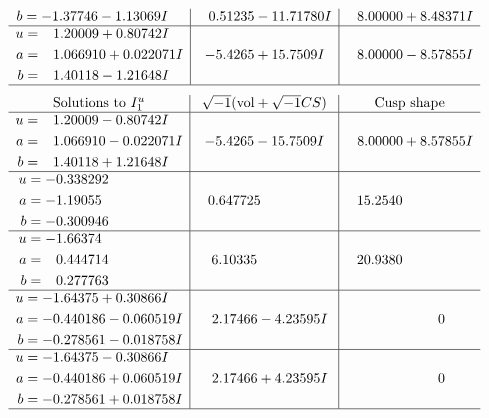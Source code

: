 \documentclass[1p]{elsarticle_modified}
\theoremstyle{definition}
\newcommand{\I}{\sqrt{-1}}
\begin{document}
$$\begin{array}{c|c|c}
\begin{aligned}
b &= -1.37746 - 1.13069 I\end{aligned}
 & \phantom{-}0.51235 - 11.71780 I & \phantom{-}8.00000 + 8.48371 I \\ \hline\begin{aligned}
u &= \phantom{-}1.20009 + 0.80742 I \\
a &= \phantom{-}1.066910 + 0.022071 I \\
b &= \phantom{-}1.40118 - 1.21648 I\end{aligned}
 & -5.4265 + 15.7509 I & \phantom{-}8.00000 - 8.57855 I\\
 \hline 
 \end{array}$$\newpage$$\begin{array}{c|c|c}  
\text{Solutions to }I^u_{1}& \I (\text{vol} + \sqrt{-1}CS) & \text{Cusp shape}\\
 \hline 
\begin{aligned}
u &= \phantom{-}1.20009 - 0.80742 I \\
a &= \phantom{-}1.066910 - 0.022071 I \\
b &= \phantom{-}1.40118 + 1.21648 I\end{aligned}
 & -5.4265 - 15.7509 I & \phantom{-}8.00000 + 8.57855 I \\ \hline\begin{aligned}
u &= -0.338292\phantom{ +0.000000I} \\
a &= -1.19055\phantom{ +0.000000I} \\
b &= -0.300946\phantom{ +0.000000I}\end{aligned}
 & \phantom{-}0.647725\phantom{ +0.000000I} & \phantom{-}15.2540\phantom{ +0.000000I} \\ \hline\begin{aligned}
u &= -1.66374\phantom{ +0.000000I} \\
a &= \phantom{-}0.444714\phantom{ +0.000000I} \\
b &= \phantom{-}0.277763\phantom{ +0.000000I}\end{aligned}
 & \phantom{-}6.10335\phantom{ +0.000000I} & \phantom{-}20.9380\phantom{ +0.000000I} \\ \hline\begin{aligned}
u &= -1.64375 + 0.30866 I \\
a &= -0.440186 - 0.060519 I \\
b &= -0.278561 - 0.018758 I\end{aligned}
 & \phantom{-}2.17466 - 4.23595 I & \phantom{-0.000000 } 0 \\ \hline\begin{aligned}
u &= -1.64375 - 0.30866 I \\
a &= -0.440186 + 0.060519 I \\
b &= -0.278561 + 0.018758 I\end{aligned}
 & \phantom{-}2.17466 + 4.23595 I & \phantom{-0.000000 } 0\\
 \hline 
 \end{array}$$\newpage\newpage\renewcommand{\arraystretch}{1}
\end{document}
